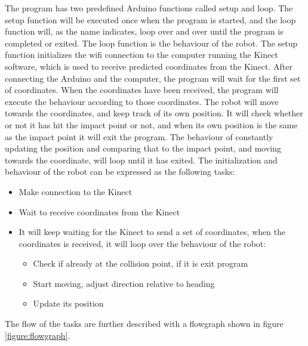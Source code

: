 The program has two predefined Arduino functions called setup and loop. The setup function will be executed once when the program is started, and the loop function will, as the name indicates, loop over and over until the program is completed or exited. The loop function is the behaviour of the robot. \newline 
The setup function initializes the wifi connection to the computer running the Kinect software, which is used to receive predicted coordinates from the Kinect. After connecting the Arduino and the computer, the program will wait for the first set of coordinates. When the coordinates have been received, the program will execute the behaviour according to those coordinates. The robot will move towards the coordinates, and keep track of its own position. It will check whether or not it has hit the impact point or not, and when its own position is the same as the impact point it will exit the program. The behaviour of constantly updating the position and comparing that to the impact point, and moving towards the coordinate, will loop until it has exited. The initialization and behaviour of the robot can be expressed as the following tasks:


\begin{itemize}
	\item Make connection to the Kinect
	\item Wait to receive coordinates from the Kinect
	\item It will keep waiting for the Kinect to send a set of coordinates, when the coordinates is received, it  will loop over the behaviour of the robot:
	\begin{itemize}
		\item Check if already at the collision point, if it is exit program
		\item Start moving, adjust direction relative to heading
		\item Update its position
	\end{itemize}
\end{itemize}
The flow of the tasks are further described with a flowgraph shown in figure \ref{figure:flowgraph}.

